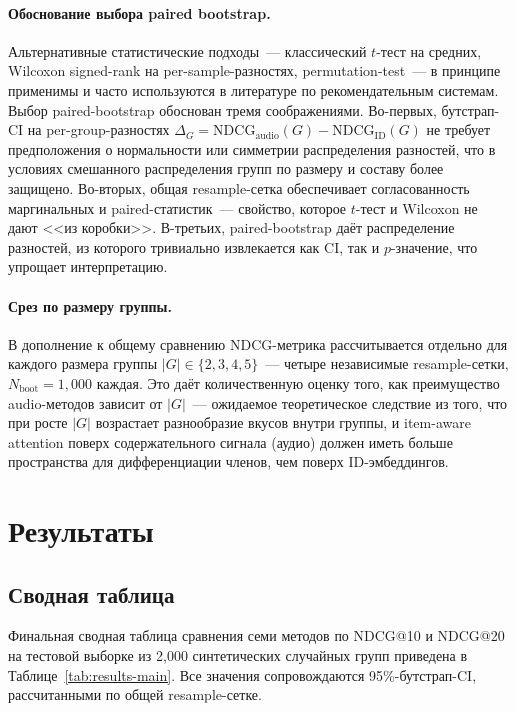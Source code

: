 \paragraph{Обоснование выбора paired bootstrap.} Альтернативные статистические подходы~--- классический $t$-тест на средних, Wilcoxon signed-rank на per-sample-разностях, permutation-test~--- в принципе применимы и часто используются в литературе по рекомендательным системам. Выбор paired-bootstrap обоснован тремя соображениями. Во-первых, бутстрап-CI на per-group-разностях $\Delta_G = \mathrm{NDCG}_{\mathrm{audio}}(G) - \mathrm{NDCG}_{\mathrm{ID}}(G)$ не требует предположения о нормальности или симметрии распределения разностей, что в условиях смешанного распределения групп по размеру и составу более защищено. Во-вторых, общая resample-сетка обеспечивает согласованность маргинальных и paired-статистик~--- свойство, которое $t$-тест и Wilcoxon не дают <<из коробки>>. В-третьих, paired-bootstrap даёт распределение разностей, из которого тривиально извлекается как CI, так и $p$-значение, что упрощает интерпретацию.

\paragraph{Срез по размеру группы.} В дополнение к общему сравнению NDCG-метрика рассчитывается отдельно для каждого размера группы $|G| \in \{2, 3, 4, 5\}$~--- четыре независимые resample-сетки, $N_{\mathrm{boot}} = 1{,}000$ каждая. Это даёт количественную оценку того, как преимущество audio-методов зависит от $|G|$~--- ожидаемое теоретическое следствие из того, что при росте $|G|$ возрастает разнообразие вкусов внутри группы, и item-aware attention поверх содержательного сигнала (аудио) должен иметь больше пространства для дифференциации членов, чем поверх ID-эмбеддингов.

\section{Результаты}\label{sec:ch3:results}

\subsection{Сводная таблица}\label{subsec:ch3:results-table}

Финальная сводная таблица сравнения семи методов по NDCG@10 и NDCG@20 на тестовой выборке из 2{,}000 синтетических случайных групп приведена в Таблице~\ref{tab:results-main}. Все значения сопровождаются 95\%-бутстрап-CI, рассчитанными по общей resample-сетке.

